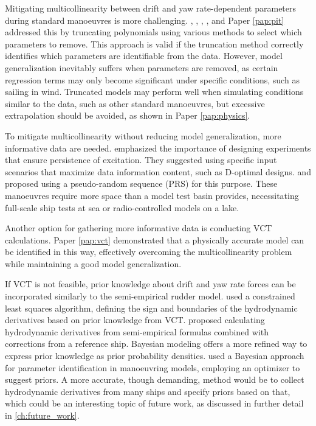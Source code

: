 Mitigating multicollinearity between drift and yaw rate-dependent parameters during standard manoeuvres is more challenging. \textcite{abkowitzMEASUREMENTHYDRODYNAMICCHARACTERISTICS1980}, \textcite{luoParameterIdentificationShip2016}, \textcite{xuUncertaintyAnalysisHydrodynamic2019}, \textcite{liuPhysicsinformedIdentificationMarine2024}, and Paper \ref{pap:pit} addressed this by truncating polynomials using various methods to select which parameters to remove. This approach is valid if the truncation method correctly identifies which parameters are identifiable from the data. However, model generalization inevitably suffers when parameters are removed, as certain regression terms may only become significant under specific conditions, such as sailing in wind. Truncated models may perform well when simulating conditions similar to the data, such as other standard manoeuvres, but excessive extrapolation should be avoided, as shown in Paper \ref{pap:physics}.

To mitigate multicollinearity without reducing model generalization, more informative data are needed. \textcite{yoonIdentificationHydrodynamicCoefficients2003} emphasized the importance of designing experiments that ensure persistence of excitation. They suggested using specific input scenarios that maximize data information content, such as D-optimal designs. \textcite{wangOptimalDesignExcitation2020} and \textcite{millerShipModelIdentification2021} proposed using a pseudo-random sequence (PRS) for this purpose. These manoeuvres require more space than a model test basin provides, necessitating full-scale ship tests at sea or radio-controlled models on a lake.

Another option for gathering more informative data is conducting VCT calculations. Paper \ref{pap:vct} demonstrated that a physically accurate model can be identified in this way, effectively overcoming the multicollinearity problem while maintaining a good model generalization.

If VCT is not feasible, prior knowledge about drift and yaw rate forces can be incorporated similarly to the semi-empirical rudder model. \textcite{chillcceDatadrivenSystemIdentification2023} used a constrained least squares algorithm, defining the sign and boundaries of the hydrodynamic derivatives based on prior knowledge from VCT. \textcite{taimuri6DoFManeuveringModel2020} proposed calculating hydrodynamic derivatives from semi-empirical formulas combined with corrections from a reference ship. Bayesian modeling offers a more refined way to express prior knowledge as prior probability densities. \textcite{xueHydrodynamicParameterIdentification2020} used a Bayesian approach for parameter identification in manoeuvring models, employing an optimizer to suggest priors. A more accurate, though demanding, method would be to collect hydrodynamic derivatives from many ships and specify priors based on that, which could be an interesting topic of future work, as discussed in further detail in \autoref{ch:future_work}.
